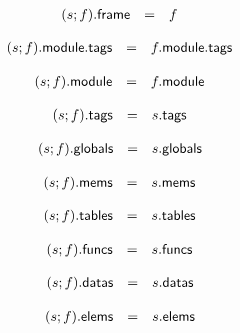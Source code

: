 $$
\begin{array}[t]{@{}lcl@{}l@{}}
(s ; f){.}\mathsf{frame} & = & f \\
\end{array}
$$

$$
\begin{array}[t]{@{}lcl@{}l@{}}
(s ; f){.}\mathsf{module}{.}\mathsf{tags} & = & f{.}\mathsf{module}{.}\mathsf{tags} \\
\end{array}
$$

$$
\begin{array}[t]{@{}lcl@{}l@{}}
(s ; f){.}\mathsf{module} & = & f{.}\mathsf{module} \\
\end{array}
$$

$$
\begin{array}[t]{@{}lcl@{}l@{}}
(s ; f){.}\mathsf{tags} & = & s{.}\mathsf{tags} \\
\end{array}
$$

$$
\begin{array}[t]{@{}lcl@{}l@{}}
(s ; f){.}\mathsf{globals} & = & s{.}\mathsf{globals} \\
\end{array}
$$

$$
\begin{array}[t]{@{}lcl@{}l@{}}
(s ; f){.}\mathsf{mems} & = & s{.}\mathsf{mems} \\
\end{array}
$$

$$
\begin{array}[t]{@{}lcl@{}l@{}}
(s ; f){.}\mathsf{tables} & = & s{.}\mathsf{tables} \\
\end{array}
$$

$$
\begin{array}[t]{@{}lcl@{}l@{}}
(s ; f){.}\mathsf{funcs} & = & s{.}\mathsf{funcs} \\
\end{array}
$$

$$
\begin{array}[t]{@{}lcl@{}l@{}}
(s ; f){.}\mathsf{datas} & = & s{.}\mathsf{datas} \\
\end{array}
$$

$$
\begin{array}[t]{@{}lcl@{}l@{}}
(s ; f){.}\mathsf{elems} & = & s{.}\mathsf{elems} \\
\end{array}
$$

